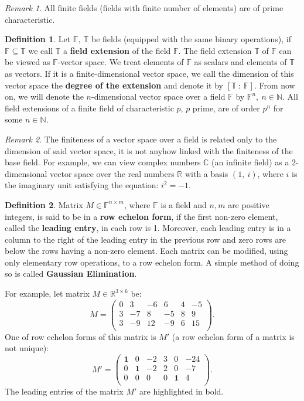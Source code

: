 \documentclass[thesis=M,english]{FITthesis}[2012/10/20]
\theoremstyle{remark}
\newtheorem*{RM}{Remark}
\theoremstyle{definition}
\newtheorem{DF}{Definition}[section]
\begin{document}
\begin{RM}
All finite fields (fields with finite number of elements) are of prime characteristic. 
\end{RM}

\begin{DF}
Let $\mathbb{F},\ \mathbb{T}$ be fields (equipped with the same binary operations), if $\mathbb{F} \subseteq \mathbb{T}$ we call $\mathbb{T}$ a \textbf{field extension} of the field $\mathbb{F}$. The field extension $\mathbb{T}$ of $\mathbb{F}$ can be viewed as $\mathbb{F}$-vector space. We treat elements of $\mathbb{F}$ as scalars and elements of $\mathbb{T}$ as vectors. If it is a finite-dimensional vector space, we call the dimension of this vector space the \textbf{degree of the extension} and denote it by $[\mathbb{T}\ :\ \mathbb{F}]$. From now on, we will denote the $n$-dimensional vector space over a field $\mathbb{F}$ by $\mathbb{F}^n,\ n \in \mathbb{N}$. All field extensions of a finite field of characteristic $p$, $p$ prime, are of order $p^n$ for some $n \in \mathbb{N}$. 
\end{DF}
\begin{RM}
The finiteness of a vector space over a field is related only to the dimension of said vector space, it is not anyhow linked with the finiteness of the base field. For example, we can view complex numbers $\mathbb{C}$ (an infinite field) as a 2-dimensional vector space over the real numbers $\mathbb{R}$ with a basis $(1,\ \mathit{i})$, where $\mathit{i}$ is the imaginary unit satisfying the equation: $\mathit{i}^2 = -1.$
\end{RM}
\begin{DF}\label{rowEch}
Matrix $M\in \mathbb{F}^{n\times m}$, where $\mathbb{F}$ is a field and $n,m$ are positive integers, is said to be in a \textbf{row echelon form}, if the first non-zero element, called the \textbf{leading entry}, in each row is 1. Moreover, each leading entry is in a column to the right of the leading entry in the previous row and zero rows are below the rows having a non-zero element. Each matrix can be modified, using only elementary row operations, to a row echelon form. A simple method of doing so is called \textbf{Gaussian Elimination}. 
\end{DF}
\noindent For example, let matrix $M \in \mathbb{R}^{3\times6}$ be:
$$
M = \begin{pmatrix}
0 & 3 & - 6 &6 & 4 & - 5 \\
3 & -7 & 8 &-5 & 8 & 9 \\
3 & -9 & 12 &-9 & 6 & 15 \\
\end{pmatrix}.
$$
One of row echelon forms of this matrix is $M'$ (a row echelon form of a matrix is not unique):
$$
M' = \begin{pmatrix}
\mathbf{1} & 0 & -2 &3 & 0 & -24 \\
0 & \mathbf{1} & -2 & 2 & 0 & -7 \\
0 & 0 & 0 &0 & \mathbf{1} & 4 \\
\end{pmatrix}.
$$
The leading entries of the matrix $M'$ are highlighted in bold.
\end{document}
